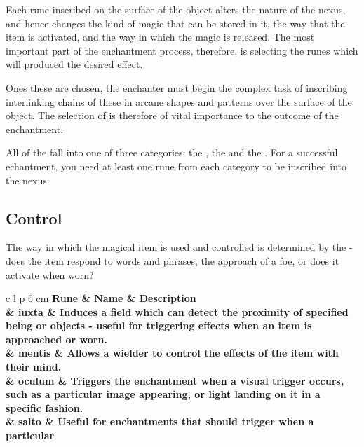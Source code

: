 Each rune inscribed on the surface of the object alters the nature of the nexus, and hence changes the kind of magic that can be stored in it, the way that the item is activated, and the way in which the magic is released. The most important part of the enchantment process, therefore, is selecting the runes which will produced the desired effect.

Ones these  are chosen, the enchanter must begin the complex task of inscribing interlinking chains of these  in arcane shapes and patterns over the surface of the object.  The selection of  is therefore of vital importance to the outcome of the enchantment. 


All of the  fall into one of three categories: the , the  and the . For a successful echantment, you need at least one rune from each category to be inscribed into the nexus. 



\newcommand\runeRow[3]
{
	\rune{#2}	&	#1	&		\small #3 \\
}
\newcommand\esoRow[3]
{
	\runeRow{#1}{#2}{Used to contain magic associated with the \key{#3} discipline.}
}

\newcommand\runeList[3]
{
	\subsection{#1}

	#2

	\begin{center}
		\begin{rndtable}{c l p {6 cm} }
			\bf Rune	&	\bf Name	&	\bf Description
			\\
			
			#3
		\end{rndtable}
	\end{center}
}






\runeList{Control}
{
	The way in which the magical item is used and controlled is determined by the \key{Control Runes} - does the item respond to words and phrases, the approach of a foe, or does it activate when worn?  
}
{
	
	\runeRow{iuxta}{a}{Induces a field which can detect the proximity of specified being or objects - useful for triggering effects when an item is approached or worn.}
	
	\runeRow{mentis}{\mentis}{Allows a wielder to control the effects of the item with their mind.}
	
	\runeRow{oculum}{\oculum}{Triggers the enchantment when a visual trigger occurs, such as a particular image appearing, or light landing on it in a specific fashion.}
	
	\runeRow{salto}{\salto}{Useful for enchantments that should trigger when a particular }
} 

